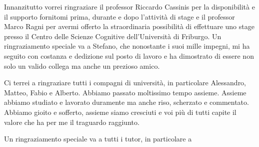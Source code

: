 Innanzitutto vorrei ringraziare il professor Riccardo Cassinis per la disponibilità e il supporto fornitomi prima, durante e dopo  l'attività di stage e il professor Marco Ragni per avermi offerto la straordinaria possibilità di effettuare uno stage presso il Centro delle Scienze Cognitive dell'Università di Friburgo.
Un ringraziamento speciale va a Stefano, che nonostante i suoi mille impegni, mi ha seguito con costanza e dedizione sul posto di lavoro e ha dimostrato di essere non solo un valido collega ma anche un prezioso amico.



Ci terrei a ringraziare tutti i compagni di università, in particolare Alessandro, Matteo, Fabio e Alberto.
Abbiamo passato moltissimo tempo assieme. 
Assieme abbiamo studiato e lavorato duramente ma anche riso, scherzato e commentato. 
Abbiamo gioito e sofferto, assieme siamo cresciuti e voi più di tutti capite il valore che ha per me il traguardo raggiunto.

	

Un ringraziamento speciale va a tutti i tutor, in particolare a  



	









